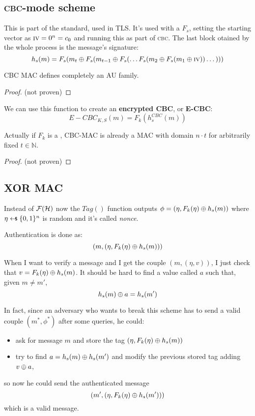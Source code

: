 \subsection{\textsc{cbc}-mode \mac{} scheme}
This is part of the standard, used in TLS. It's used with a \prf{} $F_{s}$, setting the starting vector as $\textsc{iv} = 0^n = c_0$ and running this \prf{} as part of \textsc{cbc}. The last block otained by the whole process is the message's signature:
\[
    h_s(m) = F_s(m_t \oplus F_s(m_{t-1} \oplus F_s(\dots F_s(m_2 \oplus F_s(m_1 \oplus \textsc{iv})) \dots)))
\]
\begin{lemma}
    CBC MAC defines completely an AU family.
\end{lemma}

\begin{proof}
    (not proven)
\end{proof}

We can use this function to create an \textbf{encrypted CBC}, or \textbf{E-CBC}:
\[
    E-CBC_{K, S}(m)=F_{k}(h_{s}^{CBC}(m))
\]

\begin{theorem}
    Actually if $F_k$ is a \prf, CBC-MAC is already a MAC with domain $n\cdot t$ for arbitrarily fixed $t \in \mathbb{N}$.
\end{theorem}

\begin{proof}
    (not proven)
\end{proof}

\subsection{XOR MAC}
Instead of $\mathcal{F}(\mathcal{H})$ now the $Tag()$ function outputs $\phi = (\eta , F_{k}(\eta) \oplus h_{s}(m))$ where $\eta \pickUAR \{0,1\}^{n}$ is random and it's called \textit{nonce}.

Authentication is done as:
\[
    (m,( \eta, F_{k}(\eta)\oplus h_{s}(m)))
\]

When I want to verify a message and I get the couple $(m, (\eta, v))$, I just check that $v=F_{k}(\eta) \oplus h_{s}(m)$. It should be hard to find a value called $a$ such that, given $m \not= m'$, 
\[
    h_{s}(m) \oplus a= h_{s}(m')
\]

In fact, since an adversary who wants to break this scheme has to send a valid couple $(m^{*}, \phi^{*})$ after some queries, he could:
\begin{itemize}
    \item ask for message $m$ and store the tag $( \eta, F_{k}(\eta)\oplus h_{s}(m))$
    \item try to find $a=h_{s}(m) \oplus h_{s}(m')$ and modify the previous stored tag adding $v \oplus a$, 
\end{itemize}
so now he could send the authenticated message
\[
    (m', (\eta, F_{k}(\eta) \oplus h_{s}(m'))) 
\]
which is a valid message.

